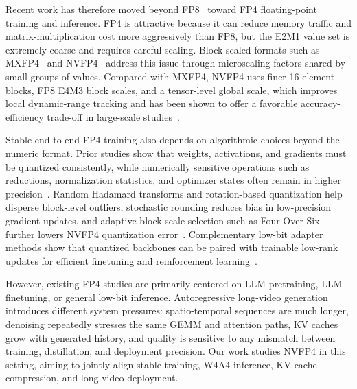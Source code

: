 Recent work has therefore moved beyond FP8~\cite{micikevicius2022fp8} toward FP4 floating-point training and inference. FP4 is attractive because it can reduce memory traffic and matrix-multiplication cost more aggressively than FP8, but the E2M1 value set is extremely coarse and requires careful scaling. Block-scaled formats such as MXFP4~\cite{ocp2023mx,rouhani2023microscaling} and NVFP4~\cite{nvidia2024blackwell,alvarez2025nvfp4} address this issue through microscaling factors shared by small groups of values. Compared with MXFP4, NVFP4 uses finer 16-element blocks, FP8 E4M3 block scales, and a tensor-level global scale, which improves local dynamic-range tracking and has been shown to offer a favorable accuracy-efficiency trade-off in large-scale studies~\cite{abecassis2025pretraining,chmiel2025fp4}.

Stable end-to-end FP4 training also depends on algorithmic choices beyond the numeric format. Prior studies show that weights, activations, and gradients must be quantized consistently, while numerically sensitive operations such as reductions, normalization statistics, and optimizer states often remain in higher precision~\cite{abecassis2025pretraining,chmiel2025fp4}. Random Hadamard transforms and rotation-based quantization help disperse block-level outliers, stochastic rounding reduces bias in low-precision gradient updates, and adaptive block-scale selection such as Four Over Six further lowers NVFP4 quantization error~\cite{ashkboos2024quarot,abecassis2025pretraining,chmiel2025fp4,cook2025four}. Complementary low-bit adapter methods show that quantized backbones can be paired with trainable low-rank updates for efficient finetuning and reinforcement learning~\cite{dettmers2023qlora,huang2025qerl}.

However, existing FP4 studies are primarily centered on LLM pretraining, LLM finetuning, or general low-bit inference. Autoregressive long-video generation introduces different system pressures: spatio-temporal sequences are much longer, denoising repeatedly stresses the same GEMM and attention paths, KV caches grow with generated history, and quality is sensitive to any mismatch between training, distillation, and deployment precision. Our work studies NVFP4 in this setting, aiming to jointly align stable training, W4A4 inference, KV-cache compression, and long-video deployment.




